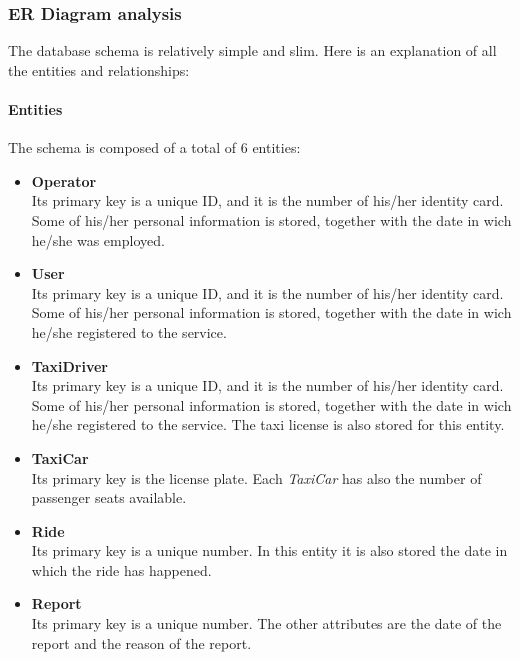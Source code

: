 \subsubsection{ER Diagram analysis} %
\label{ssub:er_diagram_analysis}

The database schema is relatively simple and slim.
Here is an explanation of all the entities and relationships:

\paragraph{Entities} %
\label{par:entities}
The schema is composed of a total of 6 entities:

\begin{itemize}
	\item {\textbf{Operator}} \\
		Its primary key is a unique ID, and it is the number of his/her identity card.
		Some of his/her personal information is stored, together with the date in wich he/she was employed.
	\item {\textbf{User}} \\
		Its primary key is a unique ID, and it is the number of his/her identity card.
		Some of his/her personal information is stored, together with the date in wich he/she registered to the service.
	\item {\textbf{TaxiDriver}} \\
		Its primary key is a unique ID, and it is the number of his/her identity card.
		Some of his/her personal information is stored, together with the date in wich he/she registered to the service.
		The taxi license is also stored for this entity.
	\item {\textbf{TaxiCar}} \\
		Its primary key is the license plate. Each \emph{TaxiCar} has also the number of passenger seats available.
	\item {\textbf{Ride}} \\
		Its primary key is a unique number. In this entity it is also stored the date in which the ride has happened.
	\item {\textbf{Report}} \\
		Its primary key is a unique number. The other attributes are the date of the report and the reason of the report.
\end{itemize}


\newpage
